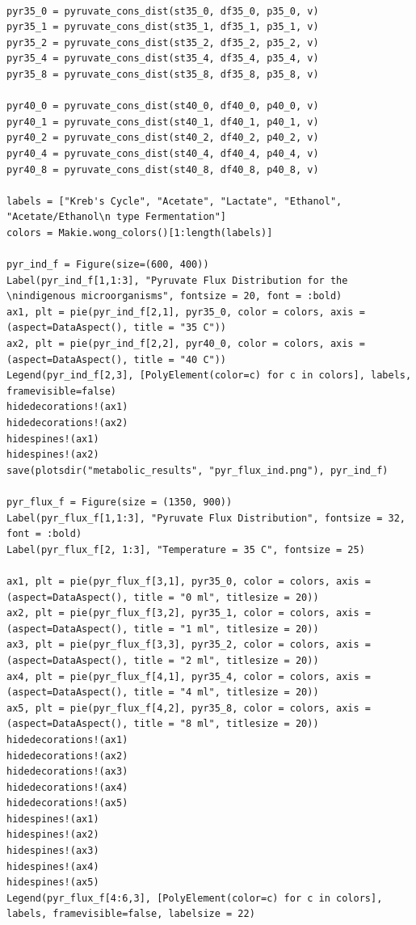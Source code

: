 \documentclass[11pt]{article}
\begin{document}
\begin{verbatim}

pyr35_0 = pyruvate_cons_dist(st35_0, df35_0, p35_0, v)
pyr35_1 = pyruvate_cons_dist(st35_1, df35_1, p35_1, v)
pyr35_2 = pyruvate_cons_dist(st35_2, df35_2, p35_2, v)
pyr35_4 = pyruvate_cons_dist(st35_4, df35_4, p35_4, v)
pyr35_8 = pyruvate_cons_dist(st35_8, df35_8, p35_8, v)

pyr40_0 = pyruvate_cons_dist(st40_0, df40_0, p40_0, v)
pyr40_1 = pyruvate_cons_dist(st40_1, df40_1, p40_1, v)
pyr40_2 = pyruvate_cons_dist(st40_2, df40_2, p40_2, v)
pyr40_4 = pyruvate_cons_dist(st40_4, df40_4, p40_4, v)
pyr40_8 = pyruvate_cons_dist(st40_8, df40_8, p40_8, v)

labels = ["Kreb's Cycle", "Acetate", "Lactate", "Ethanol", "Acetate/Ethanol\n type Fermentation"]
colors = Makie.wong_colors()[1:length(labels)]

pyr_ind_f = Figure(size=(600, 400))
Label(pyr_ind_f[1,1:3], "Pyruvate Flux Distribution for the \nindigenous microorganisms", fontsize = 20, font = :bold)
ax1, plt = pie(pyr_ind_f[2,1], pyr35_0, color = colors, axis = (aspect=DataAspect(), title = "35 C"))
ax2, plt = pie(pyr_ind_f[2,2], pyr40_0, color = colors, axis = (aspect=DataAspect(), title = "40 C"))
Legend(pyr_ind_f[2,3], [PolyElement(color=c) for c in colors], labels, framevisible=false)
hidedecorations!(ax1)
hidedecorations!(ax2)
hidespines!(ax1)
hidespines!(ax2)
save(plotsdir("metabolic_results", "pyr_flux_ind.png"), pyr_ind_f)

pyr_flux_f = Figure(size = (1350, 900))
Label(pyr_flux_f[1,1:3], "Pyruvate Flux Distribution", fontsize = 32, font = :bold)
Label(pyr_flux_f[2, 1:3], "Temperature = 35 C", fontsize = 25)

ax1, plt = pie(pyr_flux_f[3,1], pyr35_0, color = colors, axis = (aspect=DataAspect(), title = "0 ml", titlesize = 20))
ax2, plt = pie(pyr_flux_f[3,2], pyr35_1, color = colors, axis = (aspect=DataAspect(), title = "1 ml", titlesize = 20))
ax3, plt = pie(pyr_flux_f[3,3], pyr35_2, color = colors, axis = (aspect=DataAspect(), title = "2 ml", titlesize = 20))
ax4, plt = pie(pyr_flux_f[4,1], pyr35_4, color = colors, axis = (aspect=DataAspect(), title = "4 ml", titlesize = 20))
ax5, plt = pie(pyr_flux_f[4,2], pyr35_8, color = colors, axis = (aspect=DataAspect(), title = "8 ml", titlesize = 20))
hidedecorations!(ax1)
hidedecorations!(ax2)
hidedecorations!(ax3)
hidedecorations!(ax4)
hidedecorations!(ax5)
hidespines!(ax1)
hidespines!(ax2)
hidespines!(ax3)
hidespines!(ax4)
hidespines!(ax5)
Legend(pyr_flux_f[4:6,3], [PolyElement(color=c) for c in colors], labels, framevisible=false, labelsize = 22)


\end{verbatim}
\end{document}
